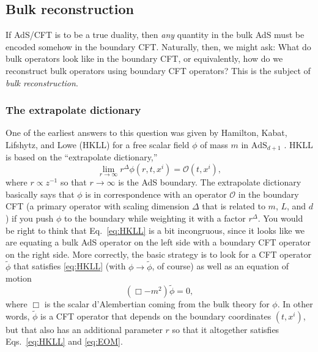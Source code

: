 \documentclass[a4paper,11pt]{article}
\newcommand{\Eq}[1]{Eq.~\eqref{#1}}
\newcommand{\Eqs}[2]{Eqs.~\eqref{#1} and \eqref{#2}}
\newcommand{\Oh}{{\mathcal{O}}}
\begin{document}
\subsection{Bulk reconstruction}

If AdS/CFT is to be a true duality, then \emph{any} quantity in the bulk AdS must be encoded somehow in the boundary CFT.
Naturally, then, we might ask: What do bulk operators look like in the boundary CFT, or equivalently, how do we reconstruct bulk operators using boundary CFT operators?
This is the subject of \emph{bulk reconstruction}.


\subsubsection{The extrapolate dictionary}

One of the earliest answers to this question was given by Hamilton, Kabat, Lifshytz, and Lowe (HKLL) for a free scalar field $\phi$ of mass $m$ in $\text{AdS}_{d+1}$ \cite{Hamilton:2006az}.
HKLL is based on the ``extrapolate dictionary,''
\begin{equation} \label{eq:HKLL}
\lim_{r \rightarrow \infty} r^\Delta \phi(r,t,x^i) = \Oh(t,x^i),
\end{equation}
where $r \propto z^{-1}$ so that $r \rightarrow \infty$ is the AdS boundary.
The extrapolate dictionary basically says that $\phi$ is in correspondence with an operator $\Oh$ in the boundary CFT (a primary operator with scaling dimension $\Delta$ that is related to $m$, $L$, and $d$) if you push $\phi$ to the boundary while weighting it with a factor $r^\Delta$.
You would be right to think that \Eq{eq:HKLL} is a bit incongruous, since it looks like we are equating a bulk AdS operator on the left side with a boundary CFT operator on the right side.
More correctly, the basic strategy is to look for a CFT operator $\tilde \phi$ that satisfies \eqref{eq:HKLL} (with $\phi \rightarrow \tilde \phi$, of course) as well as an equation of motion
\begin{equation} \label{eq:EOM}
(\Box - m^2) \tilde \phi = 0,
\end{equation}
where $\Box$ is the scalar d'Alembertian coming from the bulk theory for $\phi$.
In other words, $\tilde \phi$ is a CFT operator that depends on the boundary coordinates $(t,x^i)$, but that also has an additional parameter $r$ so that it altogether satisfies \Eqs{eq:HKLL}{eq:EOM}.
\end{document}

